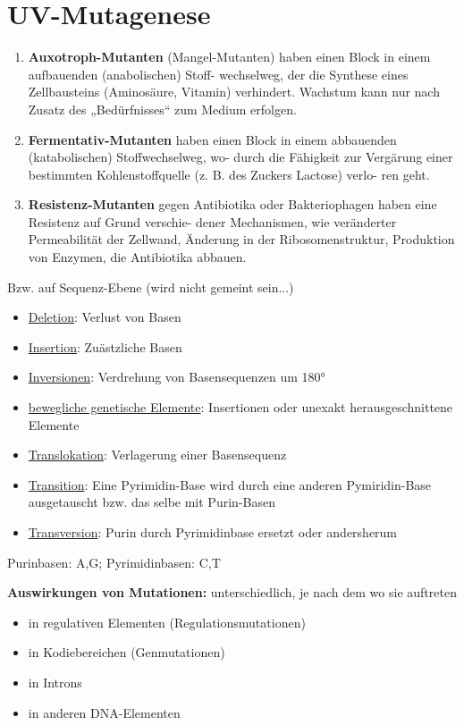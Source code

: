 
\section{UV-Mutagenese} %

\begin{mechanism}[title=Definieren Sie die Mutationstypen]
\begin{enumerate}
    \item  \textbf{Auxotroph-Mutanten} (Mangel-Mutanten) haben einen Block in einem aufbauenden (anabolischen) Stoff-
wechselweg, der die Synthese eines Zellbausteins (Aminosäure, Vitamin) verhindert. Wachstum kann nur
nach Zusatz des „Bedürfnisses“ zum Medium erfolgen.
\item \textbf{Fermentativ-Mutanten }haben einen Block in einem abbauenden (katabolischen) Stoffwechselweg, wo-
durch die Fähigkeit zur Vergärung einer bestimmten Kohlenstoffquelle (z. B. des Zuckers Lactose) verlo-
ren geht.
\item \textbf{Resistenz-Mutanten} gegen Antibiotika oder Bakteriophagen haben eine Resistenz auf Grund verschie-
dener Mechanismen, wie veränderter Permeabilität der Zellwand, Änderung in der Ribosomenstruktur,
Produktion von Enzymen, die Antibiotika abbauen.
\end{enumerate}
Bzw. auf Sequenz-Ebene (wird nicht gemeint sein...)
\begin{itemize}
    \item \underline{Deletion}: Verlust von Basen 
    \item \underline{Insertion}: Zuästzliche Basen
    \item \underline{Inversionen}: Verdrehung von Basensequenzen um 180°
    \item \underline{bewegliche genetische Elemente}: Insertionen oder unexakt herausgeschnittene Elemente 
    \item \underline{Translokation}: Verlagerung einer Basensequenz 
    \item \underline{Transition}: Eine Pyrimidin-Base wird durch eine anderen Pymiridin-Base ausgetauscht bzw. das selbe mit Purin-Basen
    \item \underline{Transversion}: Purin durch Pyrimidinbase ersetzt oder andersherum 
\end{itemize}
Purinbasen: A,G; Pyrimidinbasen: C,T
\end{mechanism}

\textbf{Auswirkungen von Mutationen:} unterschiedlich, je nach dem wo sie auftreten
\begin{itemize}
    \item in regulativen Elementen (Regulationsmutationen)
    \item in Kodiebereichen (Genmutationen)
    \item in Introns
    \item in anderen DNA-Elementen
\end{itemize}

